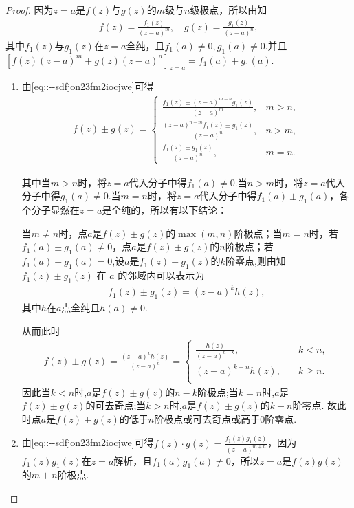\documentclass[../../main.tex]{subfiles}%
\begin{document}
\begin{proof}
因为$z=a$是$f(z)$与$g(z)$的$m$级与$n$级极点，所以由知
\begin{align}\label{eq::--sdfjon23fm2iocjwe}
f(z)=\frac{f_1(z)}{(z-a)^m},\quad g(z)=\frac{g_1(z)}{(z-a)^n},
\end{align}
其中$f_1(z)$与$g_1(z)$在$z=a$全纯，且$f_1(a)\neq0,g_1(a)\neq0$.并且$\left[ f(z)\left( z-a \right) ^m+g(z)\left( z-a \right) ^n \right] _{z=a}=f_1(a)+g_1(a).$
\begin{enumerate}[(1)]
\item 由\eqref{eq::--sdfjon23fm2iocjwe}可得
\begin{align*}
f(z)\pm g(z)=
\begin{cases}
\frac{f_1(z)\pm (z-a)^{m-n}g_1(z)}{(z-a)^m},&m>n,\\
\frac{(z-a)^{n-m}f_1(z)\pm g_1(z)}{(z-a)^n},&n>m,\\
\frac{f_1(z)\pm g_1(z)}{(z-a)^n},&m=n.
\end{cases}
\end{align*}

其中当$m>n$时，将$z=a$代入分子中得$f_1(a)\neq0$.当$n>m$时，将$z=a$代入分子中得$g_1(a)\neq0$.当$m=n$时，将$z=a$代入分子中得$f_1(a)\pm g_1(a)$，各个分子显然在$z=a$是全纯的，所以有以下结论：

当$m\neq n$时，点$a$是$f(z)\pm g(z)$的$\max(m,n)$阶极点；当$m=n$时，若$f_1(a)\pm g_1(a)\neq0$，点$a$是$f(z)\pm g(z)$的$n$阶极点；若$f_1(a)\pm g_1(a)=0$,设$a$是$f_1(z)\pm g_1(z)$的$k$阶零点,则由知\( f_1(z)\pm g_1(z) \) 在 \( a \) 的邻域内可以表示为
\begin{align*}
f_1(z)\pm g_1(z) = (z - a)^k h(z),
\end{align*}
其中$h$在$a$点全纯且$h(a)\neq 0$.

从而此时
\begin{align*}
f(z)\pm g(z)=\frac{(z-a)^kh(z)}{(z-a)^n}=\begin{cases}
\frac{h(z)}{(z-a)^{n-k}},\quad &k<n,\\
(z-a)^{k-n}h(z),\quad &k\geqslant n.\\
\end{cases}
\end{align*}
因此当$k<n$时,$a$是$f(z)\pm g(z)$的$n-k$阶极点;当$k=n$时,$a$是$f(z)\pm g(z)$的可去奇点;当$k>n$时,$a$是$f(z)\pm g(z)$的$k-n$阶零点.
故此时点$a$是$f(z)\pm g(z)$的低于$n$阶极点或可去奇点或高于$0$阶零点.

\item 由\eqref{eq::--sdfjon23fm2iocjwe}可得$f(z)\cdot g(z)=\frac{f_1(z)g_1(z)}{(z-a)^{m+n}}$，因为$f_1(z)g_1(z)$在$z=a$解析，且$f_1(a)g_1(a)\neq0$，所以$z=a$是$f(z)g(z)$的$m+n$阶极点.


\end{enumerate}
\end{proof}
\end{document}
